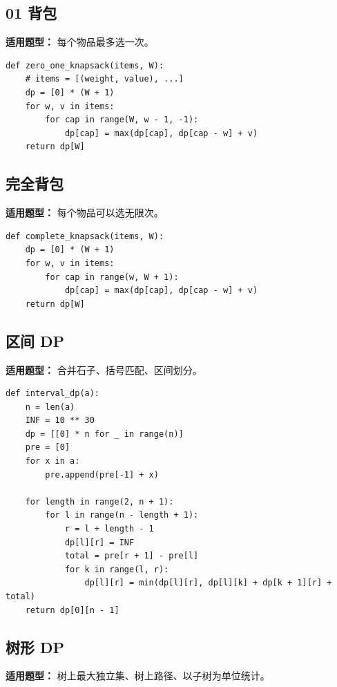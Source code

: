 \documentclass[UTF8,a4paper,14pt]{ctexart}
\begin{document}
\subsection{01 背包}

\textbf{适用题型：}
每个物品最多选一次。

\begin{lstlisting}
def zero_one_knapsack(items, W):
    # items = [(weight, value), ...]
    dp = [0] * (W + 1)
    for w, v in items:
        for cap in range(W, w - 1, -1):
            dp[cap] = max(dp[cap], dp[cap - w] + v)
    return dp[W]
\end{lstlisting}

\subsection{完全背包}

\textbf{适用题型：}
每个物品可以选无限次。

\begin{lstlisting}
def complete_knapsack(items, W):
    dp = [0] * (W + 1)
    for w, v in items:
        for cap in range(w, W + 1):
            dp[cap] = max(dp[cap], dp[cap - w] + v)
    return dp[W]
\end{lstlisting}

\subsection{区间 DP}

\textbf{适用题型：}
合并石子、括号匹配、区间划分。

\begin{lstlisting}
def interval_dp(a):
    n = len(a)
    INF = 10 ** 30
    dp = [[0] * n for _ in range(n)]
    pre = [0]
    for x in a:
        pre.append(pre[-1] + x)

    for length in range(2, n + 1):
        for l in range(n - length + 1):
            r = l + length - 1
            dp[l][r] = INF
            total = pre[r + 1] - pre[l]
            for k in range(l, r):
                dp[l][r] = min(dp[l][r], dp[l][k] + dp[k + 1][r] + total)
    return dp[0][n - 1]
\end{lstlisting}

\subsection{树形 DP}

\textbf{适用题型：}
树上最大独立集、树上路径、以子树为单位统计。
\end{document}
